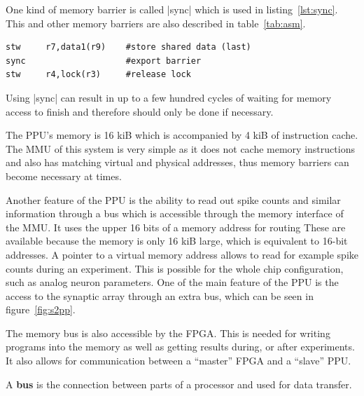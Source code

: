 {One kind of memory barrier is called |sync| which is used in listing~\ref{lst:sync}.
This and other memory barriers are also described in table~\ref{tab:asm}.

\begin{lstlisting}[caption=The memory barrier ensures that the first store has been performed before the second store is issued., label=lst:sync]
stw     r7,data1(r9)    #store shared data (last)
sync                    #export barrier
stw     r4,lock(r3)     #release lock
\end{lstlisting}

Using |sync| can result in up to a few hundred cycles of waiting for memory access to finish and therefore should only be done if necessary.

The \ac{PPU}'s memory is 16 kiB which is accompanied by 4 kiB of instruction cache.
The \ac{MMU} of this system is very simple as it does not cache memory instructions and also has matching virtual and physical addresses, thus memory barriers can become necessary at times.

Another feature of the \ac{PPU} is the ability to read out spike counts and similar information through a bus which is accessible through the memory interface of the \ac{MMU}.
It uses the upper 16 bits of a memory address for routing
These are available because the memory is only 16 kiB large, which is equivalent to 16-bit addresses.
A pointer to a virtual memory address allows to read for example spike counts during an experiment.
This is possible for the whole chip configuration, such as analog neuron parameters.
One of the main feature of the \ac{PPU} is the access to the synaptic array through an extra bus, which can be seen in figure~\ref{fig:s2pp}.

The memory bus is also accessible by the \ac{FPGA}.
This is needed for writing programs into the memory as well as getting results during, or after experiments.
It also allows for communication between a ``master'' \ac{FPGA} and a ``slave'' \ac{PPU}.

A \textbf{bus} is the connection between parts of a processor and used for data transfer.

}
